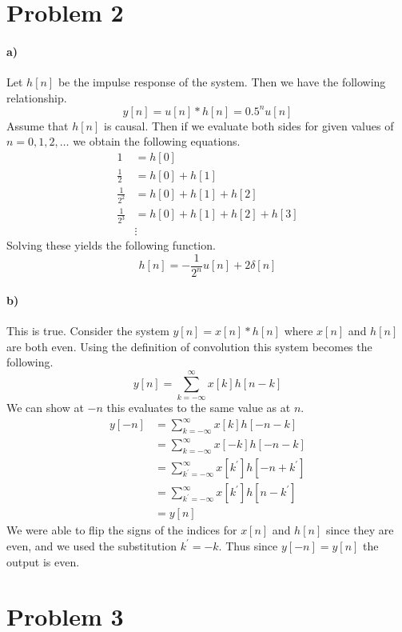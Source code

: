 \documentclass[12pt]{article}
\begin{document}
\section*{Problem 2}

\paragraph{a)}

Let \(h[n]\) be the impulse response of the system. Then we have the following relationship.
\[y[n] = u[n]*h[n] = 0.5^nu[n]\]
Assume that \(h[n]\) is causal. Then if we evaluate both sides for given values of \(n=0,1,2,\ldots\) we obtain the following equations.
\begin{align*}
    1 &= h[0]\\
    \frac{1}{2} &= h[0] + h[1]\\
    \frac{1}{2^2} &= h[0] + h[1] + h[2]\\
    \frac{1}{2^3} &= h[0] + h[1] + h[2] + h[3]\\
    &\vdots
\end{align*}
Solving these yields the following function.
\[h[n] = -\frac{1}{2^n}u[n] + 2\delta[n]\]

\paragraph{b)}

This is true. Consider the system \(y[n]=x[n]*h[n]\) where \(x[n]\) and \(h[n]\) are both even.
Using the definition of convolution this system becomes the following.
\[y[n]=\sum_{k=-\infty}^\infty x[k]h[n-k]\]
We can show at \(-n\) this evaluates to the same value as at \(n\).
\begin{align*}
    y[-n] &= \sum_{k=-\infty}^\infty x[k]h[-n-k]\\
    &=\sum_{k=-\infty}^\infty x[-k]h[-n-k]\\
    &=\sum_{k^\prime=-\infty}^\infty x[k^\prime]h[-n+k^\prime]\\
    &=\sum_{k^\prime=-\infty}^\infty x[k^\prime]h[n-k^\prime]\\
    &=y[n]
\end{align*}
We were able to flip the signs of the indices for \(x[n]\) and \(h[n]\) since they are even, and
we used the substitution \(k^\prime=-k\). Thus since \(y[-n]=y[n]\) the output is even.

\section*{Problem 3}
\end{document}
